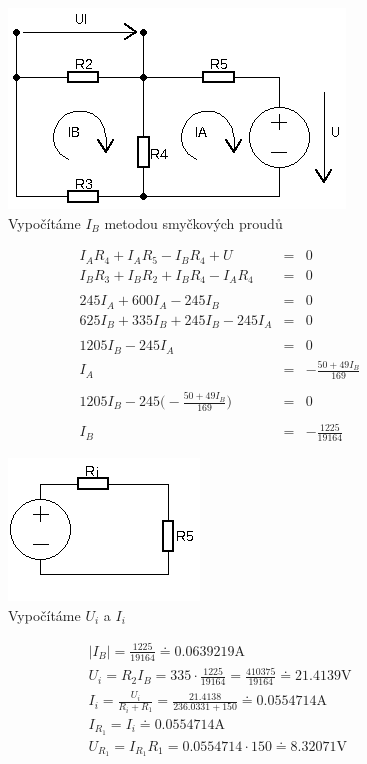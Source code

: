 \documentclass[12pt,a4paper]{article}
\begin{document}
\pagebreak
	\begin{figure}[H]
		\center\includegraphics[width=0.6\linewidth]{img7.png}
		\caption*{Vypočítáme $I_B$ metodou smyčkových proudů}
\end{figure}
\begin{eqnarray*}
	I_AR_4+I_AR_5-I_BR_4+U &= & 0\\
	I_BR_3+I_BR_2+I_BR_4-I_AR_4 &= & 0\\\\
	245 I_A + 600 I_A-245 I_B &= & 0\\
	625I_B+335I_B+245I_B-245I_A &= & 0\\\\
	1205I_B - 245I_A &= & 0\\
	I_A&= &-\frac{50+49I_B}{169}\\\\
	1205I_B-245\bigg( -\frac{50+49I_B}{169}\bigg) &= & 0\\\\
	I_B &=& -\frac{1225}{19164}	
\end{eqnarray*}
	\begin{figure}[H]
		\center\includegraphics[width=0.6\linewidth]{img8.png}
		\caption*{Vypočítáme $U_i$ a $I_i$}
\end{figure}
\begin{gather*}
	|I_B|=\frac{1225}{19164}\doteq0.0639219\text{A}\\[0.1cm]
	U_i = R_2I_B = 335\cdot\frac{1225}{19164} = \frac{410375}{19164}\doteq21.4139\text{V}\\[0.1cm]
	I_i = \frac{U_i}{R_i+R_1}=\frac{21.4138}{236.0331+150}\doteq0.0554714\text{A}\\[0.1cm]
	I_{R_1} = I_i\doteq0.0554714\text{A}\\
	U_{R_1} = I_{R_1}R_1 = 0.0554714\cdot150\doteq8.32071\text{V}
\end{gather*}
\pagebreak
\end{document}
